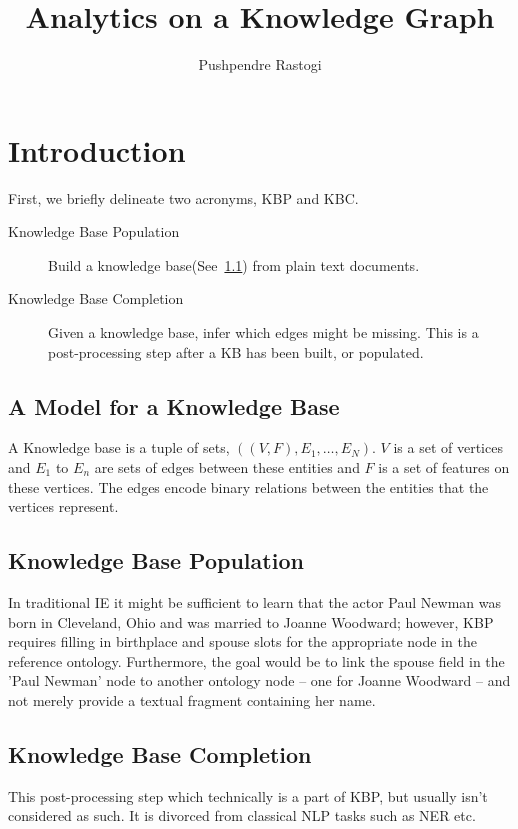 \documentclass{article}
\title{Analytics on a Knowledge Graph}
\author{Pushpendre Rastogi}
\begin{document}
\maketitle

\section{Introduction}
\label{sec:introduction}
First, we briefly delineate two acronyms, KBP and KBC.
\begin{description}
  \item[Knowledge Base Population] Build a knowledge base(See~\ref{ssec:kb}) from plain text documents.
  \item[Knowledge Base Completion] Given a knowledge base, infer which edges might be missing. This is a post-processing step after a KB has been built, or populated.
\end{description}

\subsection{A Model for a Knowledge Base}
\label{ssec:kb}
A Knowledge base is a tuple of sets, $((V, F), E_1, \ldots, E_N)$.
$V$ is a set of vertices and $E_1$ to $E_n$ are sets of edges between these
entities and $F$ is a set of features on these vertices. The edges encode binary
relations between the entities that the vertices represent.




\subsection{Knowledge Base Population}
\label{sec:knowl-base-popul}
In traditional IE it might be sufficient to learn that the actor
Paul Newman was born in Cleveland, Ohio and was married to Joanne
Woodward; however, KBP requires filling in birthplace and spouse
slots for the appropriate node in the reference ontology.
Furthermore, the goal would be to link the spouse field in the 'Paul Newman'
node to another ontology node -- one for Joanne Woodward -- and not merely
provide a textual fragment containing her name.

\subsection{Knowledge Base Completion}
This post-processing step which technically is a part of KBP, but usually isn't
considered as such. It is divorced from classical NLP tasks such as NER etc.
\end{document}
